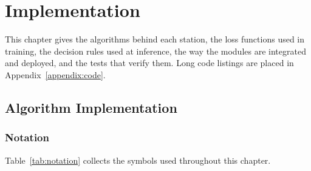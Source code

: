 \chapter{Implementation}
\label{ch:impl}

This chapter gives the algorithms behind each station, the loss functions used in training, the decision rules used at inference, the way the modules are integrated and deployed, and the tests that verify them. Long code listings are placed in Appendix~\ref{appendix:code}.

\section{Algorithm Implementation}
\label{sec:algorithm-implementation}

\subsection{Notation}
\label{sec:notation}
Table~\ref{tab:notation} collects the symbols used throughout this chapter.

